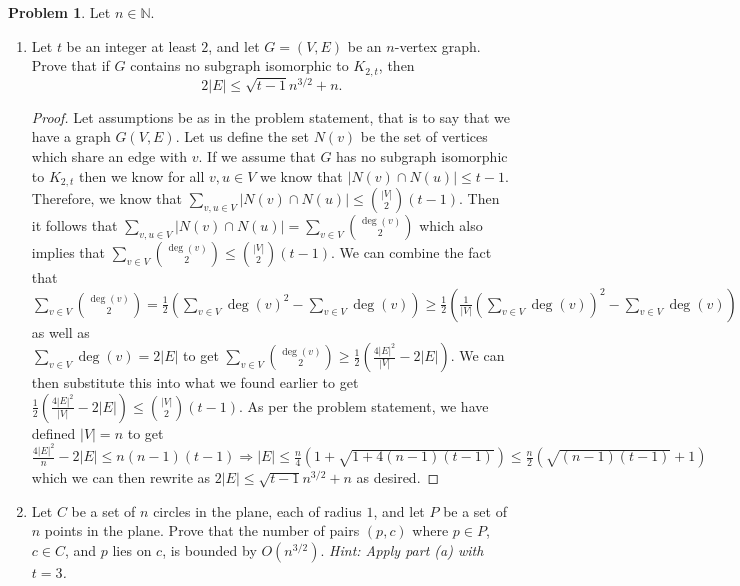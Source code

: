 \documentclass[11pt, letter]{amsart}
\theoremstyle{definition}
\newtheorem{problem}{Problem}[]
\begin{document}
\begin{problem} Let $n \in \mathbb N$.
  \begin{enumerate}[label=(\alph*)]
  \item Let $t$ be an integer  at least $2$, and let $G = (V, E)$ be an $n$-vertex graph.  Prove that if $G$ contains no subgraph isomorphic to $K_{2, t}$, then
    \begin{equation*}
      2\left| E \right| \leq \sqrt{t - 1}n^{3/2} + n.
    \end{equation*}

\begin{proof}
    Let assumptions be as in the problem statement, that is to say that we have a graph $G(V, E)$. Let us define the set $N(v)$ be the set of vertices which share an edge with $v$. If we assume that $G$ has no subgraph isomorphic to $K_{2, t}$ then we know for all $v, u\in V$ we know that $\left|N(v)\cap N(u)\right| \leq t - 1.$ Therefore, we know that $\sum_{v, u\in V}\left|N(v)\cap N(u)\right|\leq \binom{\left|V\right|}{2}\left(t - 1\right)$. Then it follows that $\sum_{v, u\in V}\left|N(v)\cap N(u)\right| = \sum_{v\in V}\binom{\deg(v)}{2}$ which also implies that $\sum_{v\in V}\binom{\deg(v)}{2} \leq \binom{\left|V\right|}{2}\left(t - 1\right)$. We can combine the fact that $\sum_{v\in V}\binom{\deg(v)}{2} = \frac{1}{2}\left(\sum_{v\in V}\deg(v)^2 - \sum_{v\in V}\deg(v)\right)\geq \frac{1}{2}\left(\frac{1}{\left|V\right|}\left(\sum_{v\in V}\deg(v)\right)^2 - \sum_{v\in V}\deg(v)\right)$ as well as\\ $\sum_{v\in V}\deg(v) = 2\left|E\right|$ to get $\sum_{v\in V}\binom{\deg(v)}{2}\geq \frac{1}{2}\left(\frac{4\left|E\right|^2}{\left|V\right|} - 2\left|E\right|\right)$. We can then substitute this into what we found earlier to get $\frac{1}{2}\left(\frac{4\left|E\right|^2}{\left|V\right|} - 2\left|E\right|\right) \leq \binom{\left|V\right|}{2}(t - 1)$. As per the problem statement, we have defined $\left|V\right| = n$ to get $\frac{4\left|E\right|^2}{n} - 2\left|E\right| \leq n(n - 1)(t - 1) \Rightarrow \left|E\right| \leq \frac{n}{4}\left(1 + \sqrt{1 + 4(n - 1)(t - 1)}\right) \leq \frac{n}{2}\left(\sqrt{(n - 1)(t - 1)} + 1\right)$ which we can then rewrite as $2\left|E\right| \leq \sqrt{t - 1}n^{3/2} + n$ as desired.
\end{proof}
    
  \item Let $C$ be a set of $n$ circles in the plane, each of radius $1$, and let $P$ be a set of $n$ points in the plane.  Prove that the number of pairs $(p, c)$ where $p \in P$, $c \in C$, and $p$ lies on $c$, is bounded by $O(n^{3/2})$.  \textit{Hint: Apply part (a) with $t = 3$.}  


\end{enumerate}
\end{problem}
\end{document}
